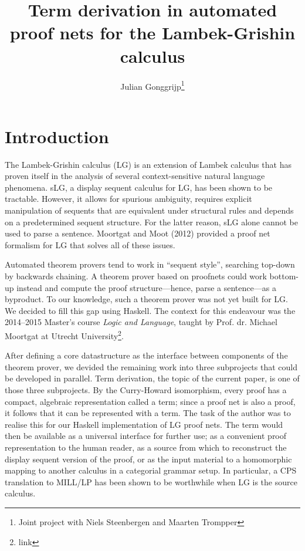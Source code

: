 \documentclass[12pt,a4paper]{article}
\begin{document}
\title{Term derivation in automated proof nets for the Lambek-Grishin calculus}
\author{Julian Gonggrijp\thanks{Joint project with Niels Steenbergen and Maarten Trompper}}
\date{}
\maketitle


\section{Introduction}

The Lambek-Grishin calculus (LG) is an extension of Lambek calculus that has proven itself in the analysis of several context-sensitive natural language phenomena. sLG, a display sequent calculus for LG, has been shown to be tractable. \cite{m09} However, it allows for spurious ambiguity, requires explicit manipulation of sequents that are equivalent under structural rules and depends on a predetermined sequent structure. For the latter reason, sLG alone cannot be used to parse a sentence. Moortgat and Moot (2012) provided a proof net formalism for LG that solves all of these issues. \cite{mm12}

Automated theorem provers tend to work in ``sequent style'', searching top-down by backwards chaining. A theorem prover based on proofnets could work bottom-up instead and compute the proof structure---hence, parse a sentence---as a byproduct. To our knowledge, such a theorem prover was not yet built for LG. We decided to fill this gap using Haskell. The context for this endeavour was the 2014--2015 Master's course \emph{Logic and Language}, taught by Prof. dr. Michael Moortgat at Utrecht University\footnote{link}.

After defining a core datastructure as the interface between components of the theorem prover, we devided the remaining work into three subprojects that could be developed in parallel. Term derivation, the topic of the current paper, is one of those three subprojects. By the Curry-Howard isomorphism, every proof has a compact, algebraic representation called a term; since a proof net is also a proof, it follows that it can be represented with a term. The task of the author was to realise this for our Haskell implementation of LG proof nets. The term would then be available as a universal interface for further use; as a convenient proof representation to the human reader, as a source from which to reconstruct the display sequent version of the proof, or as the input material to a homomorphic mapping to another calculus in a categorial grammar setup. In particular, a CPS translation to MILL/LP has been shown to be worthwhile when LG is the source calculus. \cite{mm12}
\end{document}
